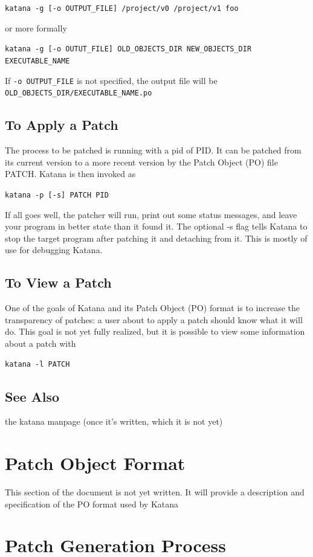\documentclass[11pt]{article}
\begin{document}
   \texttt{katana -g [-o OUTPUT\_FILE] /project/v0 /project/v1 foo}

   or more formally

   \texttt{katana -g [-o OUTUT\_FILE] OLD\_OBJECTS\_DIR NEW\_OBJECTS\_DIR EXECUTABLE\_NAME}

   If \texttt{-o OUTPUT\_FILE} is not specified, the output file will be \texttt{OLD\_OBJECTS\_DIR/EXECUTABLE\_NAME.po}
\subsection{To Apply a Patch}
\label{sec-6.3}

   The process to be patched is running with a pid of PID. It can be
   patched from its current version to a more recent version by the
   Patch Object (PO) file PATCH. Katana is then invoked as

   \texttt{katana -p [-s] PATCH PID}

   If all goes well, the patcher will run, print out some status
   messages, and leave your program in better state than it found
   it. The optional -s flag tells Katana to stop the target program
   after patching it and detaching from it. This is mostly of use for
   debugging Katana.
\subsection{To View a Patch}
\label{sec-6.4}

   One of the goals of Katana and its Patch Object (PO) format is to
   increase the transparency of patches: a user about to apply a patch
   should know what it will do. This goal is not yet fully realized,
   but it is possible to view some information about a patch with

   \texttt{katana -l PATCH}
\subsection{See Also}
\label{sec-6.5}

   the katana manpage (once it's written, which it is not yet)
\section{Patch Object Format}
\label{sec-7}

  This section of the document is not yet written. It will provide a description and specification of the PO format used by Katana
\section{Patch Generation Process}
\label{sec-8}
\end{document}
